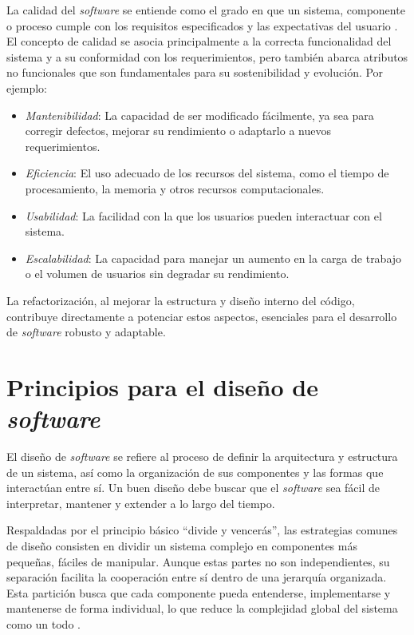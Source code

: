 La calidad del \emph{software} se entiende como el grado en que un sistema, componente o proceso cumple con los requisitos especificados y las expectativas del usuario \citep{iso9126quality}. El concepto de calidad se asocia principalmente a la correcta funcionalidad del sistema y a su conformidad con los requerimientos, pero también abarca atributos no funcionales que son fundamentales para su sostenibilidad y evolución. Por ejemplo:
\begin{itemize}
    \item \emph{Mantenibilidad}: La capacidad de ser modificado fácilmente, ya sea para corregir defectos, mejorar su rendimiento o adaptarlo a nuevos requerimientos.

    \item \emph{Eficiencia}: El uso adecuado de los recursos del sistema, como el tiempo de procesamiento, la memoria y otros recursos computacionales.

    \item \emph{Usabilidad}: La facilidad con la que los usuarios pueden interactuar con el sistema.

    \item \emph{Escalabilidad}: La capacidad para manejar un aumento en la carga de trabajo o el volumen de usuarios sin degradar su rendimiento.
\end{itemize}
La refactorización, al mejorar la estructura y diseño interno del código, contribuye directamente a potenciar estos aspectos, esenciales para el desarrollo de \emph{software} robusto y adaptable.

\section{Principios para el diseño de \emph{software}}

El diseño de \emph{software} se refiere al proceso de definir la arquitectura y estructura de un sistema, así como la organización de sus componentes y las formas que interactúan entre sí. Un buen diseño debe buscar que el \emph{software} sea fácil de interpretar, mantener y extender a lo largo del tiempo.

Respaldadas por el principio básico ``divide y vencerás'', las estrategias comunes de diseño consisten en dividir un sistema complejo en componentes más pequeñas, fáciles de manipular. Aunque estas partes no son independientes, su separación facilita la cooperación entre sí dentro de una jerarquía organizada. Esta partición busca que cada componente pueda entenderse, implementarse y mantenerse de forma individual, lo que reduce la complejidad global del sistema como un todo \citep{martin2003agilesoftwaredevelopment}.

